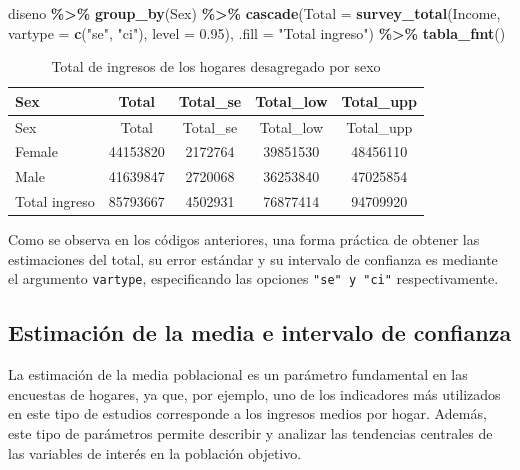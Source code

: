 \documentclass[
  spanish,
  12pt,
]{book}
\newenvironment{Shaded}{\begin{snugshade}}{\end{snugshade}}
\newcommand{\AttributeTok}[1]{\textcolor[rgb]{0.13,0.29,0.53}{#1}}
\newcommand{\FloatTok}[1]{\textcolor[rgb]{0.00,0.00,0.81}{#1}}
\newcommand{\FunctionTok}[1]{\textcolor[rgb]{0.13,0.29,0.53}{\textbf{#1}}}
\newcommand{\NormalTok}[1]{#1}
\newcommand{\SpecialCharTok}[1]{\textcolor[rgb]{0.81,0.36,0.00}{\textbf{#1}}}
\newcommand{\StringTok}[1]{\textcolor[rgb]{0.31,0.60,0.02}{#1}}
\begin{document}
\begin{Shaded}
\begin{Highlighting}[]
\NormalTok{diseno }\SpecialCharTok{\%\textgreater{}\%} 
  \FunctionTok{group\_by}\NormalTok{(Sex) }\SpecialCharTok{\%\textgreater{}\%}
  \FunctionTok{cascade}\NormalTok{(}\AttributeTok{Total =} \FunctionTok{survey\_total}\NormalTok{(Income, }
                               \AttributeTok{vartype =}  \FunctionTok{c}\NormalTok{(}\StringTok{"se"}\NormalTok{, }\StringTok{"ci"}\NormalTok{),}
                               \AttributeTok{level =} \FloatTok{0.95}\NormalTok{),}
          \AttributeTok{.fill =} \StringTok{"Total ingreso"}\NormalTok{) }\SpecialCharTok{\%\textgreater{}\%}
  \FunctionTok{tabla\_fmt}\NormalTok{()}
\end{Highlighting}
\end{Shaded}

\begin{longtable}[]{@{}lcccc@{}}
\caption{\label{tab:tab-total-ingreso-sexo}Total de ingresos de los hogares desagregado por sexo}\tabularnewline
\toprule\noalign{}
Sex & Total & Total\_se & Total\_low & Total\_upp \\
\midrule\noalign{}
\endfirsthead
\toprule\noalign{}
Sex & Total & Total\_se & Total\_low & Total\_upp \\
\midrule\noalign{}
\endhead
\bottomrule\noalign{}
\endlastfoot
Female & 44153820 & 2172764 & 39851530 & 48456110 \\
Male & 41639847 & 2720068 & 36253840 & 47025854 \\
Total ingreso & 85793667 & 4502931 & 76877414 & 94709920 \\
\end{longtable}

Como se observa en los códigos anteriores, una forma práctica de obtener las estimaciones del total, su error estándar y su intervalo de confianza es mediante el argumento \texttt{vartype}, especificando las opciones \texttt{"se"\ y\ "ci"} respectivamente.

\subsection{Estimación de la media e intervalo de confianza}\label{estimaciuxf3n-de-la-media-e-intervalo-de-confianza}

La estimación de la media poblacional es un parámetro fundamental en las encuestas de hogares, ya que, por ejemplo, uno de los indicadores más utilizados en este tipo de estudios corresponde a los ingresos medios por hogar. Además, este tipo de parámetros permite describir y analizar las tendencias centrales de las variables de interés en la población objetivo.
\end{document}

